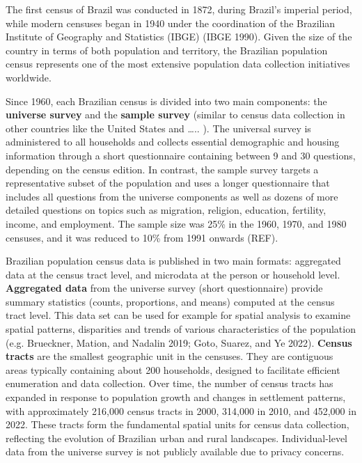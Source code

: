 \documentclass[
]{article}
\begin{document}
The first census of Brazil was conducted in 1872, during Brazil's
imperial period, while modern censuses began in 1940 under the
coordination of the Brazilian Institute of Geography and Statistics
(IBGE) (IBGE 1990). Given the size of the country in terms of both
population and territory, the Brazilian population census represents one
of the most extensive population data collection initiatives worldwide.

Since 1960, each Brazilian census is divided into two main components:
the \textbf{universe survey} and the \textbf{sample survey} (similar to
census data collection in other countries like the United States and
\ldots.. ). The universal survey is administered to all households and
collects essential demographic and housing information through a short
questionnaire containing between 9 and 30 questions, depending on the
census edition. In contrast, the sample survey targets a representative
subset of the population and uses a longer questionnaire that includes
all questions from the universe components as well as dozens of more
detailed questions on topics such as migration, religion, education,
fertility, income, and employment. The sample size was 25\% in the 1960,
1970, and 1980 censuses, and it was reduced to 10\% from 1991 onwards
(REF).

Brazilian population census data is published in two main formats:
aggregated data at the census tract level, and microdata at the person
or household level. \textbf{Aggregated data} from the universe survey
(short questionnaire) provide summary statistics (counts, proportions,
and means) computed at the census tract level. This data set can be used
for example for spatial analysis to examine spatial patterns,
disparities and trends of various characteristics of the population
(e.g. Brueckner, Mation, and Nadalin 2019; Goto, Suarez, and Ye 2022).
\textbf{Census tracts} are the smallest geographic unit in the censuses.
They are contiguous areas typically containing about 200 households,
designed to facilitate efficient enumeration and data collection. Over
time, the number of census tracts has expanded in response to population
growth and changes in settlement patterns, with approximately 216,000
census tracts in 2000, 314,000 in 2010, and 452,000 in 2022. These
tracts form the fundamental spatial units for census data collection,
reflecting the evolution of Brazilian urban and rural landscapes.
Individual-level data from the universe survey is not publicly available
due to privacy concerns.
\end{document}
